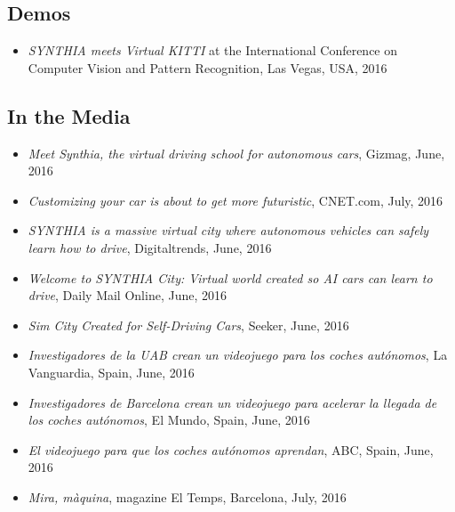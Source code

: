\subsection{Demos}
\begin{itemize}
\item \textit{SYNTHIA meets Virtual KITTI} at the International Conference on Computer Vision and Pattern Recognition, Las Vegas, USA, 2016
\end{itemize}

\subsection{In the Media}
\begin{itemize}
\item \textit{Meet Synthia, the virtual driving school for autonomous cars}, Gizmag, June, 2016
\item \textit{Customizing your car is about to get more futuristic}, CNET.com, July, 2016
\item \textit{{SYNTHIA} is a massive virtual city where autonomous vehicles can safely learn how to drive}, Digitaltrends, June, 2016
\item \textit{Welcome to {SYNTHIA} City: Virtual world created so AI cars can learn to drive}, Daily Mail Online, June, 2016
\item \textit{Sim City Created for Self-Driving Cars}, Seeker, June, 2016
\item \textit{Investigadores de la UAB crean un videojuego para los coches autónomos}, La Vanguardia, Spain, June, 2016
\item \textit{Investigadores de Barcelona crean un videojuego para acelerar la llegada de los coches autónomos}, El Mundo, Spain, June, 2016
\item \textit{El videojuego para que los coches autónomos aprendan}, ABC, Spain, June, 2016
\item \textit{Mira, màquina}, magazine El Temps, Barcelona, July, 2016
\end{itemize}